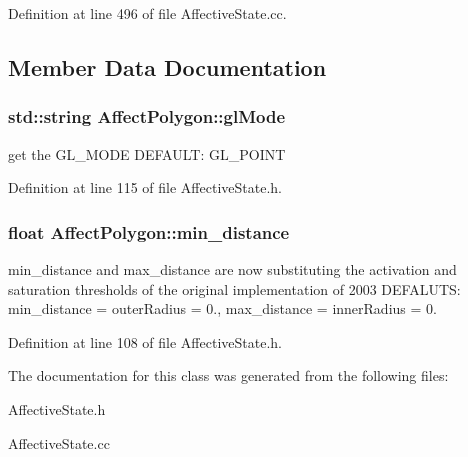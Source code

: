 \-Definition at line 496 of file \-Affective\-State.\-cc.



\subsection{\-Member \-Data \-Documentation}
\hypertarget{class_affect_polygon_aea731a4d326a3095686b529030266188}{
\subsubsection[{gl\-Mode}]{\setlength{\rightskip}{0pt plus 5cm}std\-::string {\bf \-Affect\-Polygon\-::gl\-Mode}}}
\label{class_affect_polygon_aea731a4d326a3095686b529030266188}
get the \-G\-L\-\_\-\-M\-O\-D\-E \-D\-E\-F\-A\-U\-L\-T\-: \-G\-L\-\_\-\-P\-O\-I\-N\-T 

\-Definition at line 115 of file \-Affective\-State.\-h.

\hypertarget{class_affect_polygon_abc171095a4d763dbf133ac8d3c5faa27}{
\subsubsection[{min\-\_\-distance}]{\setlength{\rightskip}{0pt plus 5cm}float {\bf \-Affect\-Polygon\-::min\-\_\-distance}}}
\label{class_affect_polygon_abc171095a4d763dbf133ac8d3c5faa27}
min\-\_\-distance and max\-\_\-distance are now substituting the activation and saturation thresholds of the original implementation of 2003 \-D\-E\-F\-A\-L\-U\-T\-S\-: min\-\_\-distance = outer\-Radius = 0., max\-\_\-distance = inner\-Radius = 0. 

\-Definition at line 108 of file \-Affective\-State.\-h.



\-The documentation for this class was generated from the following files\-:\begin{DoxyCompactItemize}
\item 
\-Affective\-State.\-h\item 
\-Affective\-State.\-cc\end{DoxyCompactItemize}
